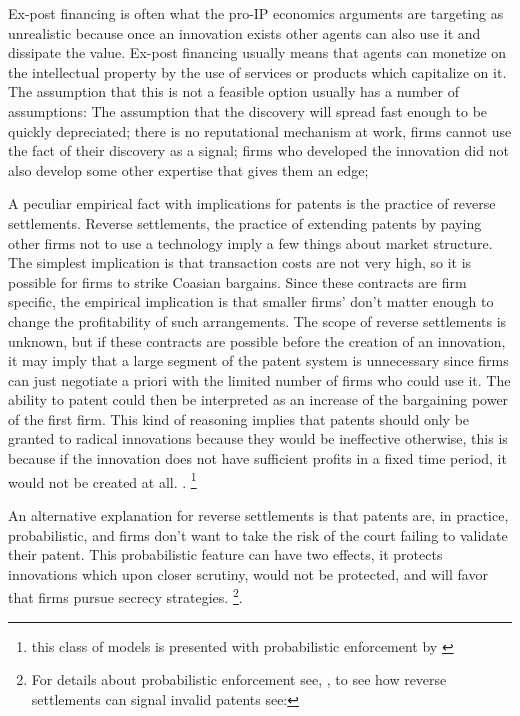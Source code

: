 \documentclass[12pt]{article}
\numberwithin{equation}{section}
\begin{document}
Ex-post financing is often what the pro-IP economics arguments are targeting as unrealistic because once an innovation exists other agents can also use it and dissipate the value. Ex-post financing usually means that agents can monetize on the intellectual property by the use of services or products which capitalize on it. The assumption that this is not a feasible option usually has a number of assumptions: The assumption that the discovery will spread fast enough to be quickly depreciated; there is no reputational mechanism at work, firms cannot use the fact of their discovery as a signal; firms who developed the innovation did not also develop some other expertise that gives them an edge; 

A peculiar empirical fact with implications for patents is the practice of reverse settlements. Reverse settlements, the practice of extending patents by paying other firms not to use a technology imply a few things about market structure. The simplest implication is that transaction costs are not very high, so it is possible for firms to strike Coasian bargains. Since these contracts are firm specific, the empirical implication is that smaller firms' don't matter enough to change the profitability of such arrangements. The scope of reverse settlements is unknown, but if these contracts are possible before the creation of an innovation, it may imply that a large segment of the patent system is unnecessary since firms can just negotiate a priori with the limited number of firms who could use it. The ability to patent could then be interpreted as an increase of the bargaining power of the first firm\cite{green1995division}. This kind of reasoning implies that patents should only be granted to radical innovations because they would be ineffective otherwise, this is because if the innovation does not have sufficient profits in a fixed time period, it would not be created at all. \cite{o1998patentability}. \footnote{this class of models is presented with probabilistic enforcement by \cite{chou2007division} }

An alternative explanation for reverse settlements is that patents are, in practice, probabilistic, and firms don't want to take the risk of the court failing to validate their patent. This probabilistic feature can have two effects, it protects innovations which upon closer scrutiny, would not be protected, and will favor that firms pursue secrecy strategies. \footnote{For details about probabilistic enforcement see, \cite{Lemley2005}, to see how reverse settlements can signal invalid patents see:\cite{Dolin2011}}. 
\end{document}

